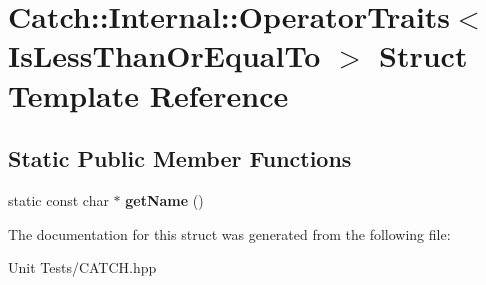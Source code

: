 \hypertarget{structCatch_1_1Internal_1_1OperatorTraits_3_01IsLessThanOrEqualTo_01_4}{}\section{Catch\+:\+:Internal\+:\+:Operator\+Traits$<$ Is\+Less\+Than\+Or\+Equal\+To $>$ Struct Template Reference}
\label{structCatch_1_1Internal_1_1OperatorTraits_3_01IsLessThanOrEqualTo_01_4}
\subsection*{Static Public Member Functions}
\begin{DoxyCompactItemize}
\item 
static const char $\ast$ {\bfseries get\+Name} ()\hypertarget{structCatch_1_1Internal_1_1OperatorTraits_3_01IsLessThanOrEqualTo_01_4_ae8578813bc847838f10448c1541a9d7b}{}\label{structCatch_1_1Internal_1_1OperatorTraits_3_01IsLessThanOrEqualTo_01_4_ae8578813bc847838f10448c1541a9d7b}

\end{DoxyCompactItemize}


The documentation for this struct was generated from the following file\+:\begin{DoxyCompactItemize}
\item 
Unit Tests/C\+A\+T\+C\+H.\+hpp\end{DoxyCompactItemize}
